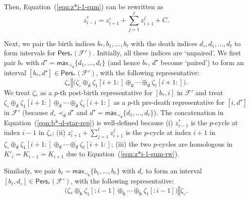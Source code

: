 \documentclass[letterpaper,11pt]{article}
\theoremstyle{mythmstyle}
\theoremstyle{mydefstyle}
\theoremstyle{plain}
\theoremstyle{definition}
\newcommand{\Pers}{\mathsf{Pers}}
\newcommand{\<}[1]{\langle #1\rangle}
\newcommand{\Set}[1]{\{#1\}}
\newcommand{\Max}{\mathsf{max}}
\newcommand{\Fcal}{\mathcal{F}}
\newcommand{\Dim}{p}
\newcommand{\bles}{\prec_{\mathsf{b}}}
\newcommand{\dles}{\prec_{\mathsf{d}}}
\newcommand{\brepsum}{\oplus_{\mathsf{b}}}
\newcommand{\drepsum}{\oplus_{\mathsf{d}}}
\newcommand{\cyc}{z}
\newcommand{\rseq}{\zeta}
\newcommand{\rconcat}{\mathbin\Vert}
\newcommand{\rsprefix}[1]{{[:\!#1]}}
\newcommand{\rssuffix}[1]{{[#1\!:]}}
\begin{document}
Then, Equation~(\ref{eqn:z*i-1-sum}) can be rewritten as
\begin{equation}
\label{eqn:z*i-1-sum-rw}
\cyc^*_{i-1}=\cyc^\circ_{i+1}+\sum_{j=1}^\ell{\cyc}^j_{i+1}+C.
\end{equation}

Next, we pair the birth indices ${b_*,b_1,\ldots,b_\ell}$
with the death indices ${d_\circ,d_1,\ldots,d_\ell}$
to form intervals for $\Pers_*(\Fcal')$.
Initially, all these indices are `unpaired'.
We first pair $b_*$ with ${d}^\star=\Max_{\dles}\Set{d_1,\ldots,d_\ell}$
(and hence $b_*$, ${d^\star}$ become `paired')
to form an interval $[b_*,{d}^\star]\in\Pers_*(\Fcal')$,
with the following representative:
\begin{equation}
\label{eqn:b*-d-star-rep}
\rseq_*\rconcat\big(\rseq_\circ\drepsum\rseq_1\rssuffix{i+1}\drepsum
\cdots\drepsum\rseq_\ell\rssuffix{i+1}\big).
\end{equation}
We treat $\rseq_*$ as a $\Dim$-th post-birth representative
for $[b_*,i]$ in $\Fcal'$
and treat $\rseq_\circ\drepsum\rseq_1\rssuffix{i+1}\drepsum
\cdots\drepsum\rseq_\ell\rssuffix{i+1}$
as a $\Dim$-th pre-death representative
for $[i,d^\star]$ in $\Fcal'$
(because $d_\circ\dles d^\star$ and ${d}^\star=\Max_{\dles}\Set{d_1,\ldots,d_\ell}$).
The concatenation in Equation~(\ref{eqn:b*-d-star-rep})
is well-defined because (i) $\cyc^*_{i-1}$ is the $\Dim$-cycle at index $i-1$ in $\rseq_*$;
(ii) $\cyc^\circ_{i+1}+\sum_{j=1}^\ell{\cyc}^j_{i+1}$ is
the $\Dim$-cycle at index $i+1$ in $\rseq_\circ\drepsum\rseq_1\rssuffix{i+1}\drepsum
\cdots\drepsum\rseq_\ell\rssuffix{i+1}$;
(iii) the two $\Dim$-cycles are homologous in $K'_i=K_{i-1}=K_{i+1}$
due to Equation~(\ref{eqn:z*i-1-sum-rw}).

Similarly, we pair $b_\ell=\Max_{\bles}\Set{b_1,\ldots,b_\ell}$ with $d_\circ$
to form an interval $[b_\ell,d_\circ]\in\Pers_*(\Fcal')$,
with the following representative:
\begin{equation}
\label{eqn:b_l-d^circ-rep}
\big(\rseq_*\brepsum\rseq_1\rsprefix{i-1}\brepsum
\cdots\brepsum\rseq_\ell\rsprefix{i-1}\big)\rconcat\rseq_\circ.
\end{equation}
\end{document}
